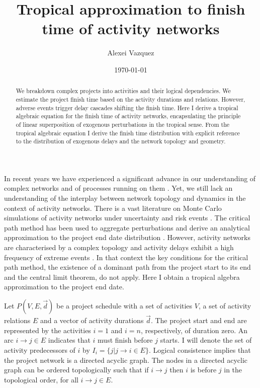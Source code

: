 \documentclass[reprint,aps,prl,amsmath,amssymb,superscriptaddress,showpacs]{revtex4-1}
\begin{document}
\title{Tropical approximation to finish time of activity networks}

\author{Alexei Vazquez}


\date{\today}

\begin{abstract}
We breakdown complex projects into activities and their logical dependencies. We estimate the
project finish time based on the activity durations and relations. However, adverse events trigger delay cascades shifting the finish time. Here I derive a tropical algebraic equation for the finish time of activity networks, encapsulating the principle of linear superposition of exogenous perturbations in the tropical sense. From the tropical algebraic equation I derive the finish time distribution with explicit reference to the distribution of exogenous delays and the network topology and geometry.
\end{abstract}

\maketitle

In recent years we have experienced a significant advance in our understanding of complex networks and of processes running on them \cite{albert02,dorogotsev08,pastor15}. Yet, we still lack an understanding of the interplay between network topology and dynamics in the context of activity networks. There is a vast literature on Monte Carlo simulations of activity networks under uncertainty and risk events \cite{acebes15,moret16}. The critical path method has been used to aggregate perturbations and derive an analytical approximation to the project end date distribution \cite{van13}. However, activity networks are characterised by a complex topology \cite{braha04,braha07,pozzana21} and activity delays exhibit a high frequency of extreme events \cite{pozzana21,araujo21,park21}. In that context the key conditions for the critical path method,  the existence of a dominant path from the project start to its end and the central limit theorem, do not apply. Here I obtain a tropical algebra approximation to the project end date.

Let $P(V,E,\vec{d})$ be a project schedule with a set of activities $V$, a set of activity relations $E$ and a vector of activity durations $\vec{d}$. The project start and end are represented by the activities $i=1$ and $i=n$, respectively, of duration zero. An arc $i\rightarrow j\in E$ indicates that $i$ must finish before $j$ starts. I will denote the set of activity predecessors of $i$ by $I_i=\{j|j\rightarrow i\in E\}$. Logical consistence implies that the project network is a directed acyclic graph.  The nodes in a directed acyclic graph can be ordered topologically such that if $i\rightarrow j$ then $i$ is before $j$ in the topological order, for all $i\rightarrow j\in E$.
\end{document}
